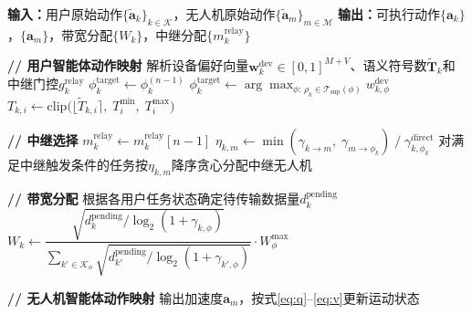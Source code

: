 \renewcommand{\algorithmiccomment}[1]{\hfill $\triangleright$ #1}
\begin{algorithm}[!ht]
\caption{异构智能体动作映射}
\label{sec4:alg_action_mapping}
\begin{algorithmic}[1]

\STATE \textbf{输入：}用户原始动作$\{\tilde{\mathbf{a}}_k\}_{k\in\mathcal{K}}$，无人机原始动作$\{\tilde{\mathbf{a}}_m\}_{m\in\mathcal{M}}$
\STATE \textbf{输出：}可执行动作$\{\mathbf{a}_k\}$，$\{\mathbf{a}_m\}$，带宽分配$\{W_k\}$，中继分配$\{m_k^{\text{relay}}\}$

\STATE \textbf{// 用户智能体动作映射}
    \STATE 解析设备偏好向量$\mathbf{w}_k^{\text{dev}} \in [0,1]^{M+V}$、语义符号数$\tilde{\mathbf{T}}_k$和中继门控$g_k^{\text{relay}}$
        \STATE $\phi_k^{\text{target}} \leftarrow \phi_k^{(n-1)}$ 
    \ELSE
        \STATE $\phi_k^{\text{target}} \leftarrow \arg\max_{\phi:\, \rho_k \in \mathcal{T}_{\text{sup}}(\phi)} w_{k,\phi}^{\text{dev}}$ 
    \ENDIF
        \STATE $T_{k,i} \leftarrow \text{clip}\big(\lfloor \tilde{T}_{k,i} \rceil,\; T_i^{\min},\; T_i^{\max}\big)$ 
    \ENDFOR
\ENDFOR

\STATE \textbf{// 中继选择}
        \STATE $m_k^{\text{relay}} \leftarrow m_k^{\text{relay}}[n-1]$ 
            \STATE $\eta_{k,m} \leftarrow \min(\gamma_{k \to m},\; \gamma_{m \to \phi_k}) \;/\; \gamma_{k,\phi_k}^{\text{direct}}$ 
        \ENDFOR
    \ENDIF
\ENDFOR
\STATE 对满足中继触发条件的任务按$\eta_{k,m}$降序贪心分配中继无人机 

\STATE \textbf{// 带宽分配}
    \STATE 根据各用户任务状态确定待传输数据量$d_k^{\text{pending}}$ 
    \STATE $W_k \leftarrow \dfrac{\sqrt{d_k^{\text{pending}} / \log_2(1+\gamma_{k,\phi})}}{\sum_{k'\in\mathcal{K}_\phi} \sqrt{d_{k'}^{\text{pending}} / \log_2(1+\gamma_{k',\phi})}} \cdot W_\phi^{\max}$ 
\ENDFOR

\STATE \textbf{// 无人机智能体动作映射}
    \STATE 输出加速度$\mathbf{a}_m$，按式\eqref{eq:q}--\eqref{eq:v}更新运动状态
\ENDFOR

\end{algorithmic}
\end{algorithm}

